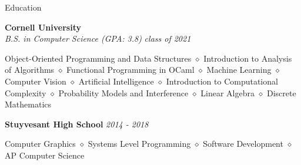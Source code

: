 \documentclass{resume} %
\date{\specialdate\today}
\begin{document}






\begin{rSection}{Education}
%


{\bf Cornell University}\\
\textit{B.S. in Computer Science (GPA: 3.8)}
 \hfill {\em class of 2021}
\item Object-Oriented Programming and Data Structures $\diamond$  Introduction to Analysis of Algorithms $\diamond$ Functional Programming in OCaml $\diamond$ Machine Learning $\diamond$ Computer Vision $\diamond$ Artificial Intelligence $\diamond$ Introduction to Computational Complexity $\diamond$ Probability Models and Interference $\diamond$ Linear Algebra $\diamond$ Discrete Mathematics


{\bf Stuyvesant High School}
 \hfill {\em 2014 - 2018}
\item Computer Graphics $\diamond$ Systems Level Programming $\diamond$ Software Development $\diamond$ AP Computer Science


\end{rSection}



\end{document}
